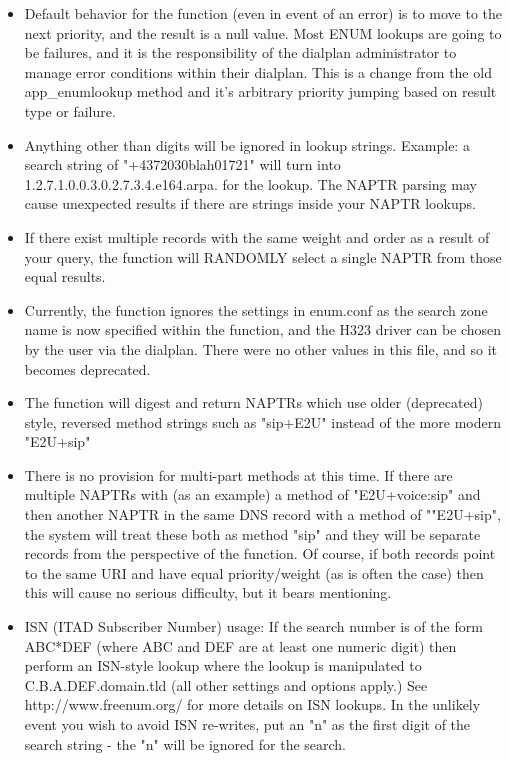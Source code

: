 \begin{itemize}
  \item Default behavior for the function (even in event of an error) is
  to move to the next priority, and the result is a null value.  Most
  ENUM lookups are going to be failures, and it is the responsibility
  of the dialplan administrator to manage error conditions within
  their dialplan.  This is a change from the old app\_enumlookup method
  and it's arbitrary priority jumping based on result type or failure.

  \item Anything other than digits will be ignored in lookup strings.
  Example: a search string of "+4372030blah01721" will turn into
  1.2.7.1.0.0.3.0.2.7.3.4.e164.arpa. for the lookup.  The NAPTR
  parsing may cause unexpected results if there are strings inside
  your NAPTR lookups.

  \item If there exist multiple records with the same weight and order as
  a result of your query, the function will RANDOMLY select a single
  NAPTR from those equal results.

  \item Currently, the function ignores the settings in enum.conf as the
  search zone name is now specified within the function, and the H323
  driver can be chosen by the user via the dialplan.  There were no
  other values in this file, and so it becomes deprecated.

  \item The function will digest and return NAPTRs which use older
  (deprecated) style, reversed method strings such as "sip+E2U"
  instead of the more modern "E2U+sip"

  \item There is no provision for multi-part methods at this time.  If
  there are multiple NAPTRs with (as an example) a method of
  "E2U+voice:sip" and then another NAPTR in the same DNS record with a
  method of ""E2U+sip", the system will treat these both as method
  "sip" and they will be separate records from the perspective of the
  function.  Of course, if both records point to the same URI and have
  equal priority/weight (as is often the case) then this will cause no
  serious difficulty, but it bears mentioning.

  \item ISN (ITAD Subscriber Number) usage:  If the search number is of
  the form ABC*DEF (where ABC and DEF are at least one numeric digit)
  then perform an ISN-style lookup where the lookup is manipulated to
  C.B.A.DEF.domain.tld (all other settings and options apply.)  See
  http://www.freenum.org/ for more details on ISN lookups.  In the
  unlikely event you wish to avoid ISN re-writes, put an "n" as the
  first digit of the search string - the "n" will be ignored for the search.
\end{itemize}

